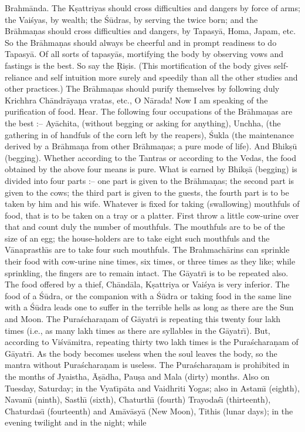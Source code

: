 Brahm\=anda. The K\d{s}attriyas should cross difficulties and dangers by force of arms; the Vai\'syas, by wealth; the \'S\=udras, by serving the twice born; and the Br\=ahma\d{n}as should cross difficulties and dangers, by Tapasy\=a, Homa, Japam, etc. So the Br\=ahma\d{n}as should always be cheerful and in prompt readiness to do Tapasy\=a. Of all sorts of tapasy\=as, mortifying the body by observing vows and fastings is the best. So say the \d{R}i\d{s}is. (This mortification of the body gives self-reliance and self intuition more surely and speedily than all the other studies and other practices.) The Br\=ahma\d{n}as should purify themselves by following duly Krichhra Ch\=andr\=aya\d{n}a vratas, etc., O N\=arada! Now I am speaking of the purification of food. Hear. The following four occupations of the Br\=ahma\d{n}as are the best :-- Ay\=achita, (without begging or asking for anything), Unchha, (the gathering in of handfuls of the corn left by the reapers), \'Sukla (the maintenance derived by a Br\=ahma\d{n}a from other Br\=ahma\d{n}as; a pure mode of life). And Bhik\d{s}\=u (begging). Whether according to the Tantras or according to the Vedas, the food obtained by the above four means is pure. What is earned by Bhik\d{s}\=a (begging) is divided into four parts :-- one part is given to the Br\=ahma\d{n}as; the second part is given to the cows; the third part is given to the guests, the fourth part is to be taken by him and his wife. Whatever is fixed for taking (swallowing) mouthfuls of food, that is to be taken on a tray or a platter. First throw a little cow-urine over that and count duly the number of mouthfuls. The mouthfuls are to be of the size of an egg; the house-holders are to take eight such mouthfuls and the V\=anaprasth\={\i}s are to take four such mouthfuls. The Brahmach\=arins can sprinkle their food with cow-urine nine times, six times, or three times as they like; while sprinkling, the fingers are to remain intact. The G\=ayatr\={\i} is to be repeated also. The food offered by a thief, Ch\=and\=ala, K\d{s}attriya or Vai\'sya is very inferior. The food of a \'S\=udra, or the companion with a \'S\=udra or taking food in the same line with a \'S\=udra leads one to suffer in the terrible hells as long as there are the Sun and Moon. The Pura\'schara\d{n}am of G\=ayatr\={\i} is repeating this twenty four lakh times (i.e., as many lakh times as there are syllables in the G\=ayatr\={\i}). But, according to Vi\'sv\=amitra, repeating thirty two lakh times is the Pura\'schara\d{n}am of G\=ayatr\={\i}. As the body becomes useless when the soul leaves the body, so the mantra without Pura\'schara\d{n}am is useless. The Pura\'schara\d{n}am is prohibited in the months of Jyaistha, \=A\d{s}\=adha, Pau\d{s}a and Mala (dirty) months. Also on Tuesday, Saturday; in the Vyat\={\i}p\=ata and Vaidhriti Yogas; also in Astam\={\i} (eighth), Navam\={\i} (ninth), Sasth\={\i} (sixth), Chaturth\={\i} (fourth) Trayoda\'s\={\i} (thirteenth), Chaturdas\={\i} (fourteenth) and Am\=av\=asy\=a (New Moon), Tithis (lunar days); in the evening twilight and in the night; while

